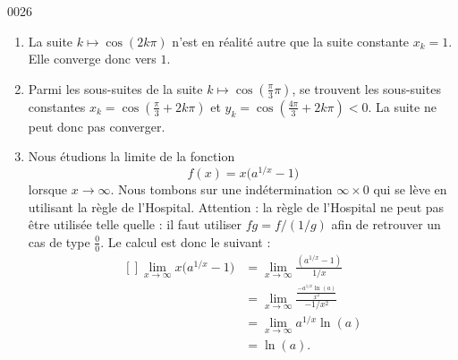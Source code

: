 
\begin{corrige}{0026}

\begin{enumerate}
\item La suite $k\mapsto \cos(2k\pi)$ n'est en réalité autre que la suite constante $x_k=1$. Elle converge donc vers $1$.
\item Parmi les sous-suites de la suite $k\mapsto\cos(\frac{ \pi }{ 3 }\pi)$, se trouvent les sous-suites constantes $x_k=\cos(\frac{ \pi }{ 3 }+2k\pi)$ et $y_k=\cos(\frac{ 4\pi }{ 3 }+2k\pi)<0$. La suite ne peut donc pas converger.
\item Nous étudions la limite de la fonction
\begin{equation}
	f(x)=x\big( a^{1/x}-1 \big)
\end{equation}
lorsque $x\to\infty$. Nous tombons sur une indétermination $\infty\times 0$ qui se lève en utilisant la règle de l'Hospital. Attention : la règle de l'Hospital ne peut pas être utilisée telle quelle : il faut utiliser $fg=f/(1/g)$ afin de retrouver un cas de type $\frac{ 0 }{ 0 }$. Le calcul est donc le suivant :
\begin{equation}
	\begin{aligned}[]
		\lim_{x\to\infty} x\big( a^{1/x}-1 \big)	&=\lim_{x\to\infty}\frac{ (a^{1/x}-1) }{ 1/x }\\
				&=\lim_{x\to\infty}\frac{ \frac{ -a^{1/x}\ln(a) }{ x^2 } }{ -1/x^2 }\\
				&=\lim_{x\to\infty}a^{1/x}\ln(a)\\
				&=\ln(a).
	\end{aligned}
\end{equation}

\end{enumerate}


\end{corrige}
